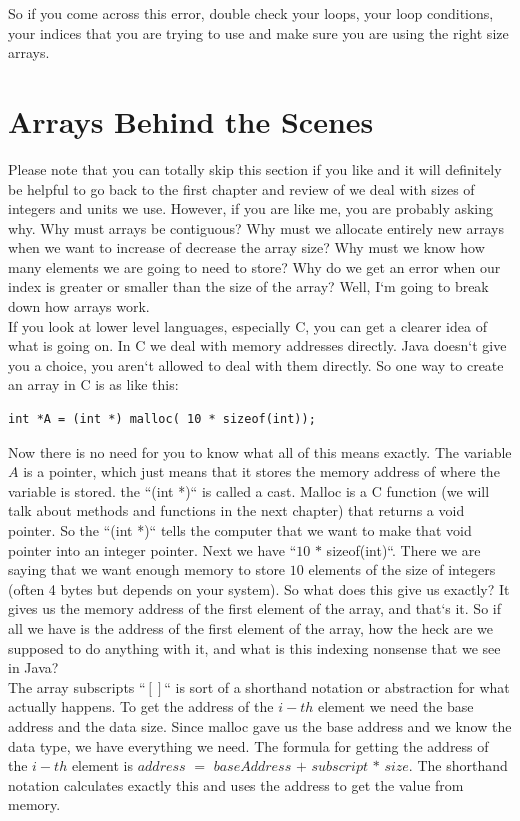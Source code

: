 \documentclass[11]{article}
\begin{document}
So if you come across this error, double check your loops, your loop conditions, your indices that you are trying to use and make sure you are using the right size arrays.

\section{Arrays Behind the Scenes}
Please note that you can totally skip this section if you like and it will definitely be helpful to go back to the first chapter and review of we deal with sizes of integers and units we use. However, if you are like me, you are probably asking why. Why must arrays be contiguous? Why must we allocate entirely new arrays when we want to increase of decrease the array size? Why must we know how many elements we are going to need to store? Why do we get an error when our index is greater or smaller than the size of the array? Well, I`m going to break down how arrays work.\\

If you look at lower level languages, especially C, you can get a clearer idea of what is going on. In C we deal with memory addresses directly. Java doesn`t give you a choice, you aren`t allowed to deal with them directly. So one way to create an array in C is as like this:

\begin{lstlisting}
int *A = (int *) malloc( 10 * sizeof(int));
\end{lstlisting}

Now there is no need for you to know what all of this means exactly. The variable $A$ is a pointer, which just means that it stores the memory address of where the variable is stored. the ``(int *)`` is called a cast. Malloc is a C function (we will talk about methods and functions in the next chapter) that returns a void pointer. So the ``(int *)`` tells the computer that we want to make that void pointer into an integer pointer. Next we have ``$10$ $*$ sizeof(int)``. There we are saying that we want  enough memory to store $10$ elements of the size of integers (often 4 bytes but depends on your system). So what does this give us exactly? It gives us the memory address of the first element of the array, and that`s it. So if all we have is the address of the first element of the array, how the heck are we supposed to do anything with it, and what is this indexing nonsense that we see in Java?\\

The array subscripts ``$[ ]$`` is sort of a shorthand notation or abstraction for what actually happens. To get the address of the $i-th$ element we need the base address and the data size. Since malloc gave us the base address and we know the data type, we have everything we need. The formula for getting the address of the $i-th$ element is $address$ $=$ $baseAddress$ $+$  $subscript$ $*$ $size$. The shorthand notation calculates exactly this and uses the address to get the value from memory.\\
\end{document}
